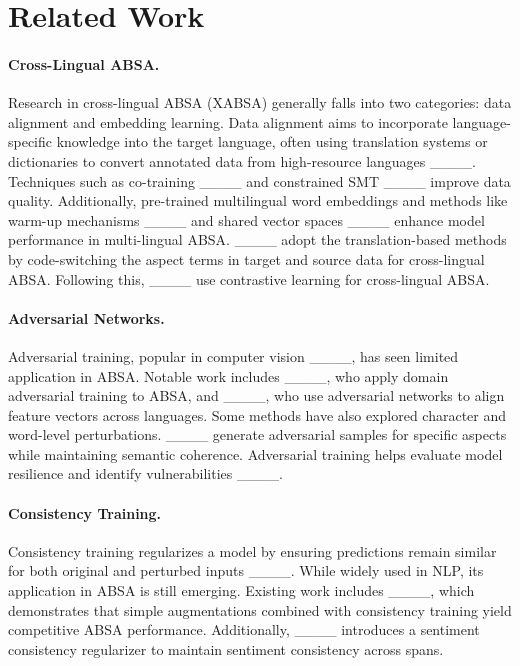 \section{Related Work}
\paragraph{Cross-Lingual ABSA.}

Research in cross-lingual ABSA (XABSA) generally falls into two categories: data alignment and embedding learning. Data alignment aims to incorporate language-specific knowledge into the target language, often using translation systems or dictionaries to convert annotated data from high-resource languages ____. Techniques such as co-training ____ and constrained SMT ____ improve data quality. Additionally, pre-trained multilingual word embeddings and methods like warm-up mechanisms ____ and shared vector spaces ____ enhance model performance in multi-lingual ABSA. ____ adopt the translation-based methods by code-switching the aspect terms in target and source data for cross-lingual ABSA. Following this, ____ use contrastive learning for cross-lingual ABSA.



\paragraph{Adversarial Networks.}

Adversarial training, popular in computer vision ____, has seen limited application in ABSA. Notable work includes ____, who apply domain adversarial training to ABSA, and ____, who use adversarial networks to align feature vectors across languages. Some methods have also explored character and word-level perturbations. ____ generate adversarial samples for specific aspects while maintaining semantic coherence. Adversarial training helps evaluate model resilience and identify vulnerabilities ____.

\paragraph{Consistency Training.}
Consistency training regularizes a model by ensuring predictions remain similar for both original and perturbed inputs ____. While widely used in NLP, its application in ABSA is still emerging. Existing work includes ____, which demonstrates that simple augmentations combined with consistency training yield competitive ABSA performance. Additionally, ____ introduces a sentiment consistency regularizer to maintain sentiment consistency across spans.